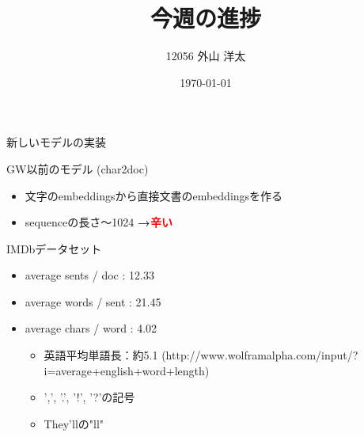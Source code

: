 \documentclass[aspectratio=43,unicode,10pt]{beamer}
\title{今週の進捗}
\institute{知能数理研究室}
\author{12056 外山 洋太}
\date{\today}
\newcommand{\fire}[1]{\textcolor{red}{\textbf{#1}}}
\newcommand{\arrow}{\textcolor{ttiblue}{\textbf{→}}\hspace{1ex}}
\begin{document}
\begin{frame}
\titlepage
\end{frame}

\begin{frame}{新しいモデルの実装}
  \begin{block}{GW以前のモデル (char2doc)}
    \begin{itemize}
      \item 文字のembeddingsから直接文書のembeddingsを作る
      \item sequenceの長さ〜1024 \arrow \fire{辛い}
    \end{itemize}
  \end{block}
  \begin{block}{IMDbデータセット}
    \begin{itemize}
      \item average sents / doc : 12.33
      \item average words / sent : 21.45
      \item average chars / word : 4.02
      \begin{itemize}
        \item 英語平均単語長：約5.1 (http://www.wolframalpha.com/input/?i=average+english+word+length)
        \item ',', '.', '!', '?'の記号
        \item They'llの"ll"
      \end{itemize}
    \end{itemize}
  \end{block}
\end{frame}
\end{document}
